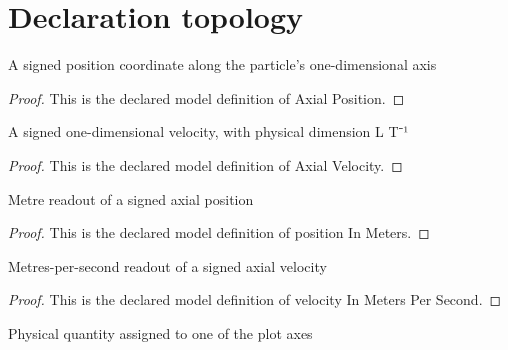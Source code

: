 \section{Declaration topology}
\begin{definition}
  \label{def:physics:phyx-mini-0669:phyxminiproblems-problemphyxmini0669-axialposition}
  A signed position coordinate along the particle's one-dimensional axis
\end{definition}
\begin{proof}
  This is the declared model definition of Axial Position.
\end{proof}
\begin{definition}
  \label{def:physics:phyx-mini-0669:phyxminiproblems-problemphyxmini0669-axialvelocity}
  A signed one-dimensional velocity, with physical dimension L T⁻¹
\end{definition}
\begin{proof}
  This is the declared model definition of Axial Velocity.
\end{proof}
\begin{definition}
  \label{def:physics:phyx-mini-0669:phyxminiproblems-problemphyxmini0669-positioninmeters}
  Metre readout of a signed axial position
\end{definition}
\begin{proof}
  This is the declared model definition of position In Meters.
\end{proof}
\begin{definition}
  \label{def:physics:phyx-mini-0669:phyxminiproblems-problemphyxmini0669-velocityinmeterspersecond}
  Metres-per-second readout of a signed axial velocity
\end{definition}
\begin{proof}
  This is the declared model definition of velocity In Meters Per Second.
\end{proof}
\begin{definition}
  \label{def:physics:phyx-mini-0669:phyxminiproblems-problemphyxmini0669-axisquantity}
  Physical quantity assigned to one of the plot axes
\end{definition}
